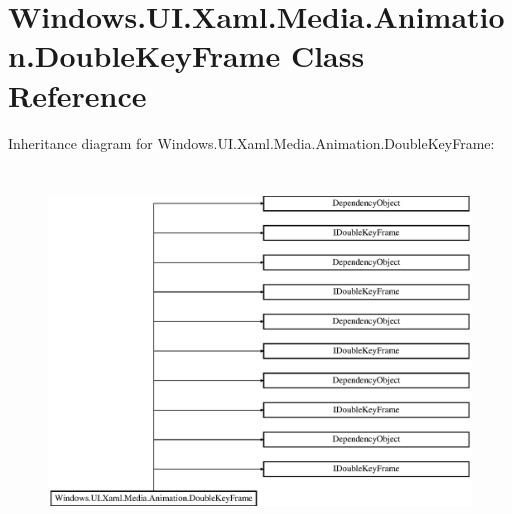 \hypertarget{class_windows_1_1_u_i_1_1_xaml_1_1_media_1_1_animation_1_1_double_key_frame}{}\section{Windows.\+U\+I.\+Xaml.\+Media.\+Animation.\+Double\+Key\+Frame Class Reference}
\label{class_windows_1_1_u_i_1_1_xaml_1_1_media_1_1_animation_1_1_double_key_frame}
Inheritance diagram for Windows.\+U\+I.\+Xaml.\+Media.\+Animation.\+Double\+Key\+Frame\+:\begin{figure}[H]
\begin{center}
\leavevmode
\includegraphics[height=9.716088cm]{class_windows_1_1_u_i_1_1_xaml_1_1_media_1_1_animation_1_1_double_key_frame}
\end{center}
\end{figure}
